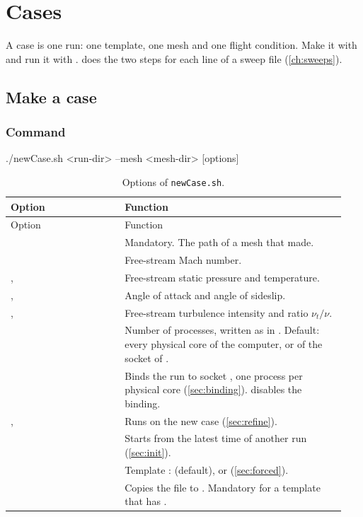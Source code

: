 \chapter{Cases}\label{ch:cases}

A case is one run: one template, one mesh and one flight condition. Make it with
 and run it with .  does the two
steps for each line of a sweep file (\cref{ch:sweeps}).

\section{Make a case}\label{sec:make-case}

\subsection{Command}

\begin{shell}
./newCase.sh <run-dir> --mesh <mesh-dir> [options]
\end{shell}

\begin{longtable}{@{}P{0.32\linewidth} P{0.62\linewidth}@{}}
\caption{Options of \texttt{newCase.sh}.}\label{tab:newcase}\\
\toprule
Option & Function \\
\midrule
\endfirsthead
\toprule
Option & Function \\
\midrule
\endhead
{} & Mandatory. The path of a mesh that  made. \\
 & Free-stream Mach number. \\
,  & Free-stream static pressure and temperature. \\
,  & Angle of attack and angle of sideslip. \\
,  & Free-stream turbulence intensity and ratio $\nu_t/\nu$. \\
 & Number of processes, written as  in . Default: every physical core of the computer, or of the socket of . \\
 & Binds the run to socket , one process per physical core (\cref{sec:binding}).  disables the binding. \\
,  & Runs  on the new case (\cref{sec:refine}). \\
 & Starts from the latest time of another run (\cref{sec:init}). \\
 & Template :  (default),  or  (\cref{sec:forced}). \\
 & Copies the file to . Mandatory for a template that has . \\
\bottomrule
\end{longtable}

